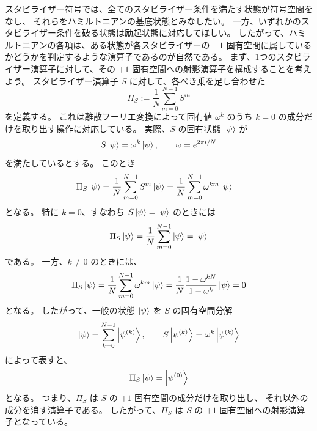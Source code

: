 \documentclass[../master.tex]{subfiles}
\begin{document}
スタビライザー符号では、全てのスタビライザー条件を満たす状態が符号空間をなし、
それらをハミルトニアンの基底状態とみなしたい。
一方、いずれかのスタビライザー条件を破る状態は励起状態に対応してほしい。
したがって、ハミルトニアンの各項は、ある状態が各スタビライザーの $+1$ 固有空間に属しているかどうかを判定するような演算子であるのが自然である。
まず、1つのスタビライザー演算子に対して、その $+1$ 固有空間への射影演算子を構成することを考えよう。
スタビライザー演算子 $S$ に対して、各べき乗を足し合わせた
\begin{equation}
    \Pi_S := \frac{1}{N}\sum_{m=0}^{N-1} S^m \label{eq:chap3_proj_operator}
\end{equation}
を定義する。
これは離散フーリエ変換によって固有値 $\omega^k$ のうち $k=0$ の成分だけを取り出す操作に対応している。
実際、$S$ の固有状態 $\ket{\psi}$ が
\begin{equation}
    S\ket{\psi} = \omega^k \ket{\psi},\qquad \omega=e^{2\pi i/N}
\end{equation}
を満たしているとする。
このとき
\begin{equation}\begin{aligned}[b]
    \Pi_S\ket{\psi}
    &= \frac{1}{N}\sum_{m=0}^{N-1}S^m\ket{\psi}
    = \frac{1}{N}\sum_{m=0}^{N-1}\omega^{km}\ket{\psi}
\end{aligned}\end{equation}
となる。
特に $k=0$、すなわち $S\ket{\psi}=\ket{\psi}$ のときには
\begin{equation}
    \Pi_S\ket{\psi}=\frac{1}{N}\sum_{m=0}^{N-1}\ket{\psi}=\ket{\psi}
\end{equation}
である。
一方、$k\neq 0$ のときには、
\begin{equation}
    \Pi_S\ket{\psi}=\frac{1}{N}\sum_{m=0}^{N-1}\omega^{km}\ket{\psi}=\frac{1}{N}\frac{1-\omega^{kN}}{1-\omega^k}\ket{\psi}=0
\end{equation}
となる。
したがって、一般の状態 $\ket{\psi}$ を $S$ の固有空間分解
\begin{equation}
    \ket{\psi}=\sum_{k=0}^{N-1}\ket{\psi^{(k)}},\qquad
    S\ket{\psi^{(k)}}=\omega^k\ket{\psi^{(k)}}
\end{equation}
によって表すと、
\begin{equation}
    \Pi_S\ket{\psi}=\ket{\psi^{(0)}}
\end{equation}
となる。
つまり、$\Pi_S$ は $S$ の $+1$ 固有空間の成分だけを取り出し、
それ以外の成分を消す演算子である。
したがって、$\Pi_S$ は $S$ の $+1$ 固有空間への射影演算子となっている。
\end{document}
